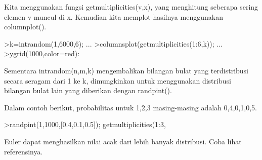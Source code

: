\documentclass[a4paper,10pt]{article}
\begin{document}
\begin{eulernotebook}
\begin{eulercomment}
\begin{eulercomment}
\begin{eulercomment}
\begin{eulercomment}
\begin{eulercomment}
\begin{eulercomment}
\begin{eulercomment}
\begin{eulercomment}
\begin{eulercomment}
\begin{eulercomment}
\begin{eulercomment}
\begin{eulercomment}
\begin{eulercomment}
\begin{eulercomment}
\begin{eulercomment}
\begin{eulercomment}
\begin{eulercomment}
\begin{eulercomment}
\begin{eulercomment}
Kita menggunakan fungsi getmultiplicities(v,x), yang menghitung
seberapa sering elemen v muncul di x. Kemudian kita memplot hasilnya
menggunakan columnplot().
\end{eulercomment}
\begin{eulerprompt}
>k=intrandom(1,6000,6);  ...
>columnsplot(getmultiplicities(1:6,k));  ...
>ygrid(1000,color=red):
\end{eulerprompt}
\begin{eulercomment}
Sementara intrandom(n,m,k) mengembalikan bilangan bulat yang
terdistribusi secara seragam dari 1 ke k, dimungkinkan untuk
menggunakan distribusi bilangan bulat lain yang diberikan dengan
randpint().

Dalam contoh berikut, probabilitas untuk 1,2,3 masing-masing adalah
0,4,0,1,0,5.
\end{eulercomment}
\begin{eulerprompt}
>randpint(1,1000,[0.4,0.1,0.5]); getmultiplicities(1:3,%
\end{eulerprompt}
\begin{euleroutput}
  [378,  102,  520]
\end{euleroutput}
\begin{eulercomment}
Euler dapat menghasilkan nilai acak dari lebih banyak distribusi. Coba
lihat referensinya.


\end{eulercomment}
\end{eulercomment}
\end{eulercomment}
\end{eulercomment}
\end{eulercomment}
\end{eulercomment}
\end{eulercomment}
\end{eulercomment}
\end{eulercomment}
\end{eulercomment}
\end{eulercomment}
\end{eulercomment}
\end{eulercomment}
\end{eulercomment}
\end{eulercomment}
\end{eulercomment}
\end{eulercomment}
\end{eulercomment}
\end{eulercomment}
\end{eulernotebook}
\end{document}
